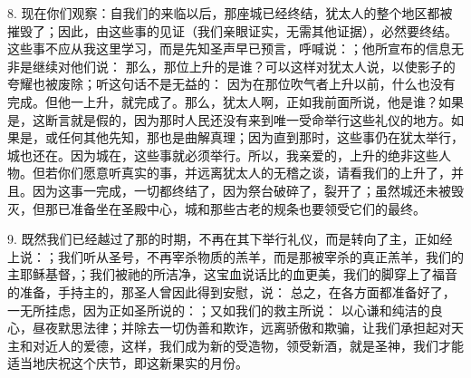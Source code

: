 8. 现在你们观察：自我们的来临以后，那座城已经终结，犹太人的整个地区都被摧毁了；因此，由这些事的见证（我们亲眼证实，无需其他证据），必然要终结。这些事不应从我这里学习，而是先知圣声早已预言，呼喊说：；他所宣布的信息无非是继续对他们说： 那么，那位上升的是谁？可以这样对犹太人说，以使影子的夸耀也被废除；听这句话不是无益的： 因为在那位吹气者上升以前，什么也没有完成。但他一上升，就完成了。那么，犹太人啊，正如我前面所说，他是谁？如果是，这断言就是假的，因为那时人民还没有来到唯一受命举行这些礼仪的地方。如果是，或任何其他先知，那也是曲解真理；因为直到那时，这些事仍在犹太举行，城也还在。因为城在，这些事就必须举行。所以，我亲爱的，上升的绝非这些人物。但若你们愿意听真实的事，并远离犹太人的无稽之谈，请看我们的上升了，并且。因为这事一完成，一切都终结了，因为祭台破碎了，裂开了；虽然城还未被毁灭，但那已准备坐在圣殿中心，城和那些古老的规条也要领受它们的最终。\par

9. 既然我们已经越过了那的时期，不再在其下举行礼仪，而是转向了主，正如经上说：；我们听从圣号，不再宰杀物质的羔羊，而是那被宰杀的真正羔羊，我们的主耶稣基督，；我们被祂的所洁净，这宝血说话比的血更美，我们的脚穿上了福音的准备，手持主的，那圣人曾因此得到安慰，说： 总之，在各方面都准备好了，一无所挂虑，因为正如圣所说的：；又如我们的救主所说： 以心谦和纯洁的良心，昼夜默思法律；并除去一切伪善和欺诈，远离骄傲和欺骗，让我们承担起对天主和对近人的爱德，这样，我们成为新的受造物，领受新酒，就是圣神，我们才能适当地庆祝这个庆节，即这新果实的月份。\par

